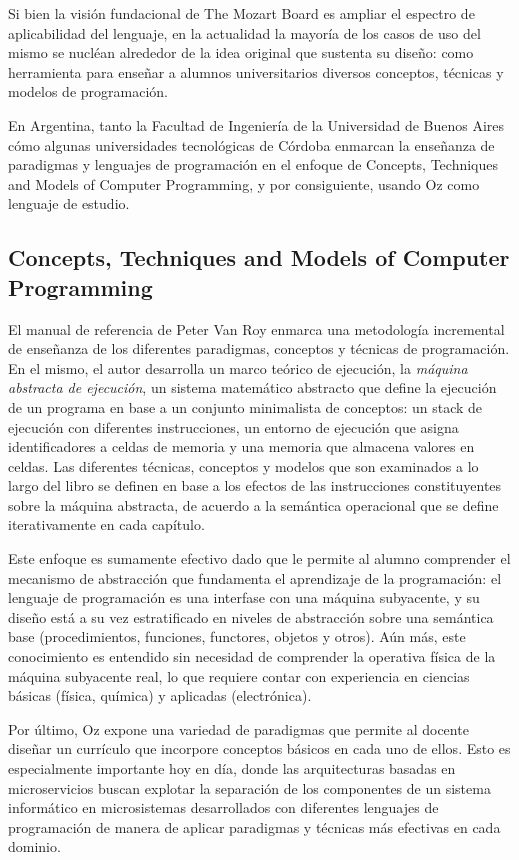 \documentclass[a4paper,11pt]{article}
\begin{document}
Si bien la visión fundacional de The Mozart Board es ampliar el espectro de
aplicabilidad del lenguaje, en la actualidad la mayoría de los casos de uso del
mismo se nucléan alrededor de la idea original que sustenta su diseño: como
herramienta para enseñar a alumnos universitarios diversos conceptos, técnicas
y modelos de programación. 

En Argentina, tanto la Facultad de Ingeniería de la Universidad de Buenos Aires
cómo algunas universidades tecnológicas de Córdoba enmarcan la enseñanza de
paradigmas y lenguajes de programación en el enfoque de Concepts, Techniques
and Models of Computer Programming, y por consiguiente, usando Oz como lenguaje
de estudio.

\subsection{Concepts, Techniques and Models of Computer Programming}

El manual de referencia de Peter Van Roy enmarca una metodología incremental de
enseñanza de los diferentes paradigmas, conceptos y técnicas de programación.
En el mismo, el autor desarrolla un marco teórico de ejecución, la
\emph{máquina abstracta de ejecución}, un sistema matemático abstracto que
define la ejecución de un programa en base a un conjunto minimalista de
conceptos: un stack de ejecución con diferentes instrucciones, un entorno de
ejecución que asigna identificadores a celdas de memoria y una memoria que
almacena valores en celdas. Las diferentes técnicas, conceptos y modelos que
son examinados a lo largo del libro se definen en base a los efectos de las
instrucciones constituyentes sobre la máquina abstracta, de acuerdo a la
semántica operacional que se define iterativamente en cada capítulo.

Este enfoque es sumamente efectivo dado que le permite al alumno comprender el
mecanismo de abstracción que fundamenta el aprendizaje de la programación: el
lenguaje de programación es una interfase con una máquina subyacente, y su
diseño está a su vez estratificado en niveles de abstracción sobre una
semántica base (procedimientos, funciones, functores, objetos y otros). Aún
más, este conocimiento es entendido sin necesidad de comprender la operativa
física de la máquina subyacente real, lo que requiere contar con experiencia en
ciencias básicas (física, química) y aplicadas (electrónica).

Por último, Oz expone una variedad de paradigmas que permite al docente diseñar
un currículo que incorpore conceptos básicos en cada uno de ellos. Esto es
especialmente importante hoy en día, donde las arquitecturas basadas en
microservicios buscan explotar la separación de los componentes de un sistema
informático en microsistemas desarrollados con diferentes lenguajes de
programación de manera de aplicar paradigmas y técnicas más efectivas en cada
dominio.
\end{document}
